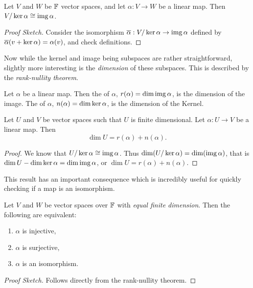 \documentclass[a4paper]{scrartcl}
\begin{document}
\begin{theorem}
    Let $V$ and $W$ be $\mathbb{F}$ vector spaces, and let $\alpha: V \rightarrow W$ be a linear map. Then $V/\operatorname{ker} \alpha \cong \operatorname{img} \alpha$.
\end{theorem}
\begin{proof}[Proof Sketch]
    Consider the isomorphism $\overline{\alpha} : V/\operatorname{ker} \alpha \rightarrow \operatorname{img} \alpha$ defined by $\overline{\alpha}(v + \operatorname{ker} \alpha) = \alpha(v)$, and check definitions.
\end{proof}

Now while the kernel and image being subspaces are rather straightforward, slightly more interesting is the \emph{dimension} of these subspaces. This is described by the \emph{rank-nullity theorem}.

\begin{definition}
    Let $\alpha$ be a linear map. Then the  of $\alpha$, $r(\alpha) = \dim \operatorname{img} \alpha$, is the dimension of the image. The  of $\alpha$, $n(\alpha) = \dim \operatorname{ker} \alpha$, is the dimension of the Kernel.
\end{definition}

\begin{theorem}
    Let $U$ and $V$ be vector spaces such that $U$ is finite dimensional.
    Let $\alpha: U \rightarrow V$ be a linear map. Then
    $$
    \dim U = r(\alpha) + n(\alpha).
    $$
\end{theorem}
\begin{proof}
    We know that $U/\operatorname{ker} \alpha \cong \operatorname{img} \alpha$. Thus $\dim (U / \operatorname{ker} \alpha) = \dim (\operatorname{img} \alpha)$, that is $\dim U - \dim \operatorname{ker} \alpha = \dim \operatorname{img} \alpha$, or $\dim U = r(\alpha) + n(\alpha)$.
\end{proof}

This result has an important consequence which is incredibly useful for quickly checking if a map is an isomorphism.

\begin{lemma}
    Let $V$ and $W$ be vector spaces over $\mathbb{F}$ with \emph{equal finite dimension}. Then the following are equivalent: 
    \begin{enumerate}[label=(\roman*)]
        \item $\alpha$ is injective,
        \item $\alpha$ is surjective,
        \item $\alpha$ is an isomorphism.
    \end{enumerate}
\end{lemma}
\begin{proof}[Proof Sketch]
    Follows directly from the rank-nullity theorem.
\end{proof}
\end{document}
